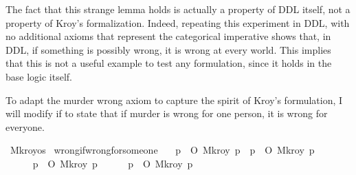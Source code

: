 \begin{isabellebody}
\begin{isamarkuptext}
The fact that this strange lemma holds is actually a property of DDL itself, not a property
of Kroy's formalization. Indeed, repeating this experiment in DDL, with no
additional axioms that represent the categorical imperative shows that, in DDL, if something is 
possibly wrong, it is wrong at every world. This implies that this is not a useful example to test any formulation,
since it holds in the base logic itself.%
\end{isamarkuptext}\isamarkuptrue%
%
\begin{isamarkuptext}%
To adapt the murder wrong axiom to capture the spirit of Kroy's formulation, I will modify if 
to state that if murder is wrong for one person, it is wrong for everyone.%
\end{isamarkuptext}\isamarkuptrue%
\isamarkupfalse%
\ M{\isacharunderscore}kroy{\isacharcolon}{\isacharcolon}{\isachardoublequoteopen}os{\isachardoublequoteclose}\isanewline
%
\isanewline
\isanewline
{}\isamarkupfalse%
\ wrong{\isacharunderscore}if{\isacharunderscore}wrong{\isacharunderscore}for{\isacharunderscore}someone{\isacharcolon}\isanewline
\ \ \ {\isachardoublequoteopen}{\isacharparenleft}{\isasymexists}p{\isachardot}\ {\isasymTurnstile}\ O\ {\isacharbraceleft}\isactrlbold {\isasymnot}{\isacharparenleft}M{\isacharunderscore}kroy\ p{\isacharparenright}{\isacharbraceright}{\isacharparenright}\ {\isasymlongrightarrow}\ {\isacharparenleft}{\isasymforall}p{\isachardot}\ {\isasymTurnstile}\ O\ {\isacharbraceleft}\isactrlbold {\isasymnot}{\isacharparenleft}M{\isacharunderscore}kroy\ p{\isacharparenright}{\isacharbraceright}{\isacharparenright}{\isachardoublequoteclose}\isanewline
%
\isadelimproof
\ \ %
\endisadelimproof
%
\isatagproof
{}\isamarkupfalse%
\ \isanewline
\ \ \ \ \isamarkupfalse%
\ {\isachardoublequoteopen}{\isacharparenleft}{\isasymexists}p{\isachardot}\ {\isasymTurnstile}\ O\ {\isacharbraceleft}\isactrlbold {\isasymnot}{\isacharparenleft}M{\isacharunderscore}kroy\ p{\isacharparenright}{\isacharbraceright}{\isacharparenright}{\isachardoublequoteclose}\isanewline
\ \ \ \ \isamarkupfalse%
\ {\isachardoublequoteopen}{\isacharparenleft}{\isasymforall}p{\isachardot}\ {\isasymTurnstile}\ O\ {\isacharbraceleft}\isactrlbold {\isasymnot}{\isacharparenleft}M{\isacharunderscore}kroy\ p{\isacharparenright}{\isacharbraceright}{\isacharparenright}{\isachardoublequoteclose}\isanewline
\ \ \ \ \ \ \isamarkupfalse%

\end{isabellebody}
